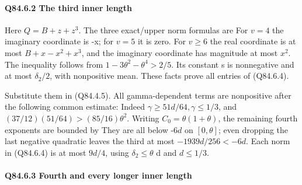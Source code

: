 \paragraph{Q84.6.2 The third inner length}

Here \(Q=B+z+z^3\). The three exact/upper norm formulas are
For \(v=4\) the imaginary coordinate is -x; for \(v=5\) it is zero.
For \(v\ge 6\) the real coordinate is at most \(B+x-x^2+x^3\), and the
imaginary coordinate has magnitude at most \(x^2\). The inequality
follows from \(1-3\theta^2-\theta^4>2/5\). Its constant s is
nonnegative and at most \(\delta_2/2\), with nonpositive mean.
These facts prove all entries of (Q84.6.4).

Substitute them in (Q84.4.5). All gamma-dependent terms are nonpositive
after the following common estimate:
Indeed \(\gamma\ge 51d/64,\allowbreak  \gamma\le 1/3\), and
\((37/12)(51/64)>(85/16)\theta^2\).
Writing \(C_0=\theta(1+\theta)\), the remaining fourth exponents are
bounded by
They are all below -\(6d\) on \([0,\allowbreak  \theta]\); even dropping the last
negative quadratic leaves the third at most \(-1939d/256<-6d\).
Each norm in (Q84.6.4) is at most \(9d/4\), using \(\delta_2\le \theta\) d and \(d\le 1/3\).

\paragraph{Q84.6.3 Fourth and every longer inner length}

